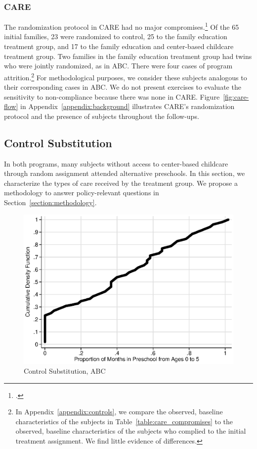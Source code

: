 \subsubsection{CARE}

\noindent The randomization protocol in CARE had no major compromises.\footnote{\citet{Wasik_Ramey_etal_1990_CD,Burchinal_Campbell_etal_1997_CD}.} Of the 65 initial families, 23 were randomized to control, 25 to the family education treatment group, and 17 to the family education and center-based childcare treatment group. Two families in the family education treatment group had twins who were jointly randomized, as in ABC. There were four cases of program attrition.\footnote{In Appendix~\ref{appendix:controls}, we compare the observed, baseline characteristics of the subjects in Table~\ref{table:care_compromises} to the observed, baseline characteristics of the subjects who complied to the initial treatment assignment. We find little evidence of differences.} For methodological purposes, we consider these subjects analogous to their corresponding cases in ABC. We do not present exercises to evaluate the sensitivity to non-compliance because there was none in CARE. Figure~\ref{fig:care-flow} in Appendix~\ref{appendix:background} illustrates CARE's randomization protocol and the presence of subjects throughout the follow-ups.\\

\subsection{Control Substitution}

\noindent In both programs, many subjects without access to center-based childcare through random assignment attended alternative preschools. In this section, we characterize the types of care received by the treatment group. We propose a methodology to answer policy-relevant questions in Section~\ref{section:methodology}.\\

\begin{figure}[H]
		\caption{Control Substitution, ABC} \label{fig:treatsubabc}
		\includegraphics[width=.9\columnwidth]{output/abc_controlcontamination_months.eps}
\end{figure}

